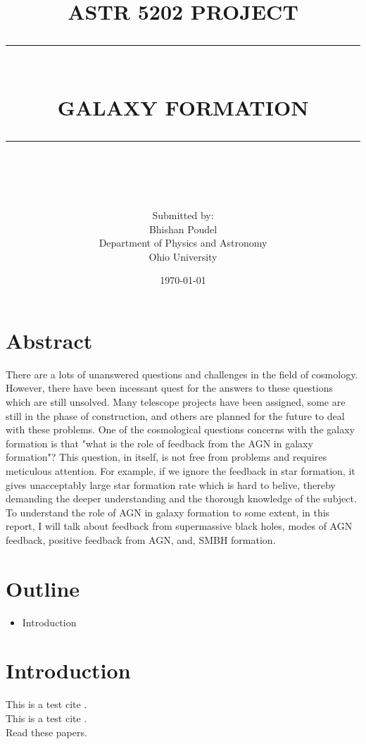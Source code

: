 \documentclass[12pt]{article}
\newcommand{\HRule}[1]{\rule{\linewidth}{#1}}
\begin{document}
\title{ \normalsize \textsc{ASTR 5202 PROJECT}
		\\ [2.0cm]
		\HRule{0.5pt} \\
		\LARGE \textbf{\uppercase{GALAXY FORMATION}}
		\HRule{2pt} \\ [0.5cm]
		\normalsize  \vspace*{5\baselineskip}}

\date{\today}

\author{
		Submitted by:\\
		Bhishan Poudel\\
		Department of Physics and Astronomy\\ 
        Ohio University}
\newpage
\maketitle
\clearpage

\section*{Abstract}

There are a lots of unanswered questions and challenges in the field of cosmology. However, there have been incessant quest for the answers to these questions which are still unsolved. Many telescope projects have been assigned, some are still in the phase of construction, and others are planned for the future to deal with these problems. One of the cosmological questions concerns with the galaxy formation is that "what is the role of feedback from the AGN in galaxy formation"? This question, in itself, is not free from problems and requires meticulous attention. For example, if we ignore the feedback in star formation, it gives unacceptably large star formation rate which is hard to belive, thereby demanding the deeper understanding and the thorough knowledge of the subject. To understand the role of AGN in galaxy formation to some extent, in this report, I will talk about feedback from supermassive black holes, modes of AGN feedback, positive feedback from AGN, and, SMBH formation.
\clearpage

{\tiny }\section*{Outline}
\begin{itemize}
  \item Introduction


\end{itemize}

 \section{ Introduction}
This is a test cite \cite{silk13}.\\
This is a test cite \cite{fabian12}.\\

Read these papers.



\end{document}
